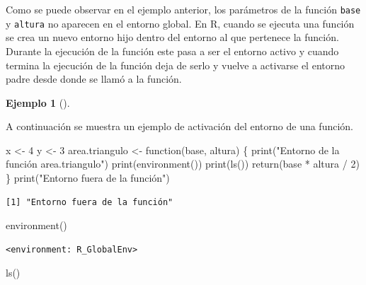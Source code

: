 \documentclass[
  a4paper,
]{scrreport}
\newenvironment{Shaded}{\begin{snugshade}}{\end{snugshade}}
\newcommand{\ControlFlowTok}[1]{\textcolor[rgb]{0.00,0.23,0.31}{#1}}
\newcommand{\DecValTok}[1]{\textcolor[rgb]{0.68,0.00,0.00}{#1}}
\newcommand{\FunctionTok}[1]{\textcolor[rgb]{0.28,0.35,0.67}{#1}}
\newcommand{\NormalTok}[1]{\textcolor[rgb]{0.00,0.23,0.31}{#1}}
\newcommand{\OtherTok}[1]{\textcolor[rgb]{0.00,0.23,0.31}{#1}}
\newcommand{\SpecialCharTok}[1]{\textcolor[rgb]{0.37,0.37,0.37}{#1}}
\newcommand{\StringTok}[1]{\textcolor[rgb]{0.13,0.47,0.30}{#1}}
\theoremstyle{definition}
\theoremstyle{definition}
\newtheorem{example}{Ejemplo}[chapter]
\theoremstyle{remark}
\begin{document}
Como se puede observar en el ejemplo anterior, los parámetros de la
función \texttt{base} y \texttt{altura} no aparecen en el entorno
global. En R, cuando se ejecuta una función se crea un nuevo entorno
hijo dentro del entorno al que pertenece la función. Durante la
ejecución de la función este pasa a ser el entorno activo y cuando
termina la ejecución de la función deja de serlo y vuelve a activarse el
entorno padre desde donde se llamó a la función.

\leavevmode{}%
\begin{example}[]\label{exm-activacion-entorno-funcion}

A continuación se muestra un ejemplo de activación del entorno de una
función.

\begin{Shaded}
\begin{Highlighting}[]
\NormalTok{x }\OtherTok{\textless{}{-}} \DecValTok{4}
\NormalTok{y }\OtherTok{\textless{}{-}} \DecValTok{3}
\NormalTok{area.triangulo }\OtherTok{\textless{}{-}} \ControlFlowTok{function}\NormalTok{(base, altura) \{}
  \FunctionTok{print}\NormalTok{(}\StringTok{"Entorno de la función area.triangulo"}\NormalTok{) }
  \FunctionTok{print}\NormalTok{(}\FunctionTok{environment}\NormalTok{())}
  \FunctionTok{print}\NormalTok{(}\FunctionTok{ls}\NormalTok{())}
  \FunctionTok{return}\NormalTok{(base }\SpecialCharTok{*}\NormalTok{ altura }\SpecialCharTok{/} \DecValTok{2}\NormalTok{)}
\NormalTok{\}}
\FunctionTok{print}\NormalTok{(}\StringTok{"Entorno fuera de la función"}\NormalTok{)}
\end{Highlighting}
\end{Shaded}

\begin{verbatim}
[1] "Entorno fuera de la función"
\end{verbatim}

\begin{Shaded}
\begin{Highlighting}[]
\FunctionTok{environment}\NormalTok{()}
\end{Highlighting}
\end{Shaded}

\begin{verbatim}
<environment: R_GlobalEnv>
\end{verbatim}

\begin{Shaded}
\begin{Highlighting}[]
\FunctionTok{ls}\NormalTok{()}
\end{Highlighting}
\end{Shaded}


\end{example}
\end{document}
